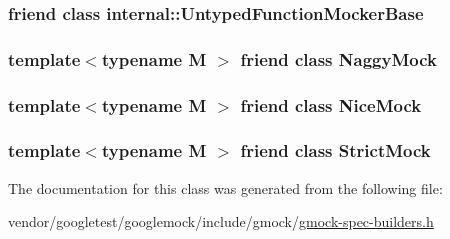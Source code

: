 \subsubsection[{\texorpdfstring{internal\+::\+Untyped\+Function\+Mocker\+Base}{internal::UntypedFunctionMockerBase}}]{\setlength{\rightskip}{0pt plus 5cm}friend class {\bf internal\+::\+Untyped\+Function\+Mocker\+Base}\hspace{0.3cm}{\ttfamily [friend]}}\hypertarget{classtesting_1_1Mock_aa199ba5b2fe114afc42c43912a582feb}{}\label{classtesting_1_1Mock_aa199ba5b2fe114afc42c43912a582feb}
\subsubsection[{\texorpdfstring{Naggy\+Mock}{NaggyMock}}]{\setlength{\rightskip}{0pt plus 5cm}template$<$typename M $>$ friend class {\bf Naggy\+Mock}\hspace{0.3cm}{\ttfamily [friend]}}\hypertarget{classtesting_1_1Mock_aee2e427ecb34e6662477add3bb5f8819}{}\label{classtesting_1_1Mock_aee2e427ecb34e6662477add3bb5f8819}
\subsubsection[{\texorpdfstring{Nice\+Mock}{NiceMock}}]{\setlength{\rightskip}{0pt plus 5cm}template$<$typename M $>$ friend class {\bf Nice\+Mock}\hspace{0.3cm}{\ttfamily [friend]}}\hypertarget{classtesting_1_1Mock_a9e796f79d4c876398f83aa7678dddc46}{}\label{classtesting_1_1Mock_a9e796f79d4c876398f83aa7678dddc46}
\subsubsection[{\texorpdfstring{Strict\+Mock}{StrictMock}}]{\setlength{\rightskip}{0pt plus 5cm}template$<$typename M $>$ friend class {\bf Strict\+Mock}\hspace{0.3cm}{\ttfamily [friend]}}\hypertarget{classtesting_1_1Mock_a88b3d71476c27b82c88bd49e8297e20e}{}\label{classtesting_1_1Mock_a88b3d71476c27b82c88bd49e8297e20e}


The documentation for this class was generated from the following file\+:\begin{DoxyCompactItemize}
\item 
vendor/googletest/googlemock/include/gmock/\hyperlink{gmock-spec-builders_8h}{gmock-\/spec-\/builders.\+h}\end{DoxyCompactItemize}
